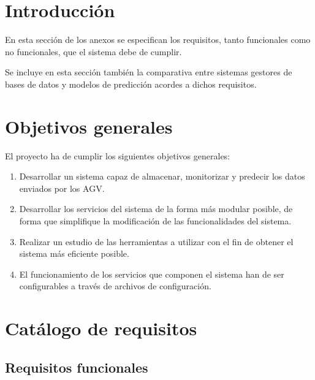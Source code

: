 
\section{Introducción}

En esta sección de los anexos se especifican los requisitos, tanto funcionales como no funcionales, que el sistema 
debe de cumplir.

Se incluye en esta sección también la comparativa entre sistemas gestores de bases de datos y modelos de predicción 
acordes a dichos requisitos.

\section{Objetivos generales}

El proyecto ha de cumplir los siguientes objetivos generales:
\begin{enumerate}
	\item Desarrollar un sistema capaz de almacenar, monitorizar y predecir los datos enviados por los AGV.
	\item Desarrollar los servicios del sistema de la forma más modular posible, de forma que simplifique la modificación de las
		funcionalidades del sistema.
	\item Realizar un estudio de las herramientas a utilizar con el fin de obtener el sistema más eficiente posible.
	\item El funcionamiento de los servicios que componen el sistema han de ser configurables a través de archivos de
		configuración.
\end{enumerate}

\section{Catálogo de requisitos}

\subsection{Requisitos funcionales}

